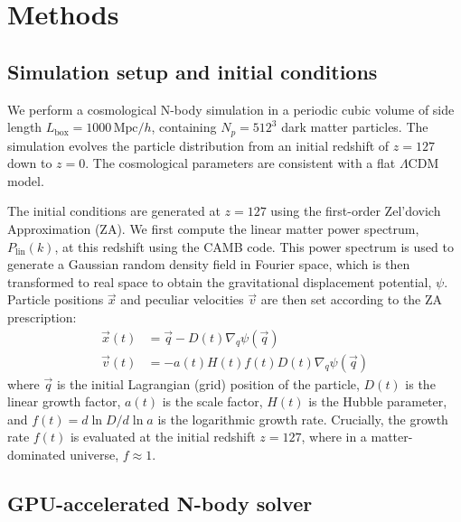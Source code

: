 \documentclass[]{article}
\begin{document}
\section{Methods}
\label{sec:methods}
\subsection{Simulation setup and initial conditions}

We perform a cosmological N-body simulation in a periodic cubic volume of side length $L_{\text{box}} = 1000 \, \text{Mpc}/h$, containing $N_p = 512^3$ dark matter particles. The simulation evolves the particle distribution from an initial redshift of $z=127$ down to $z=0$. The cosmological parameters are consistent with a flat $\Lambda$CDM model.

The initial conditions are generated at $z=127$ using the first-order Zel'dovich Approximation (ZA). We first compute the linear matter power spectrum, $P_{\text{lin}}(k)$, at this redshift using the CAMB code. This power spectrum is used to generate a Gaussian random density field in Fourier space, which is then transformed to real space to obtain the gravitational displacement potential, $\psi$. Particle positions $\vec{x}$ and peculiar velocities $\vec{v}$ are then set according to the ZA prescription:
\begin{align}
\vec{x}(t) &= \vec{q} - D(t) \nabla_q \psi(\vec{q}) \\
\vec{v}(t) &= -a(t) H(t) f(t) D(t) \nabla_q \psi(\vec{q})
\end{align}
where $\vec{q}$ is the initial Lagrangian (grid) position of the particle, $D(t)$ is the linear growth factor, $a(t)$ is the scale factor, $H(t)$ is the Hubble parameter, and $f(t) = d \ln D / d \ln a$ is the logarithmic growth rate. Crucially, the growth rate $f(t)$ is evaluated at the initial redshift $z=127$, where in a matter-dominated universe, $f \approx 1$.

\subsection{GPU-accelerated N-body solver}
\end{document}
